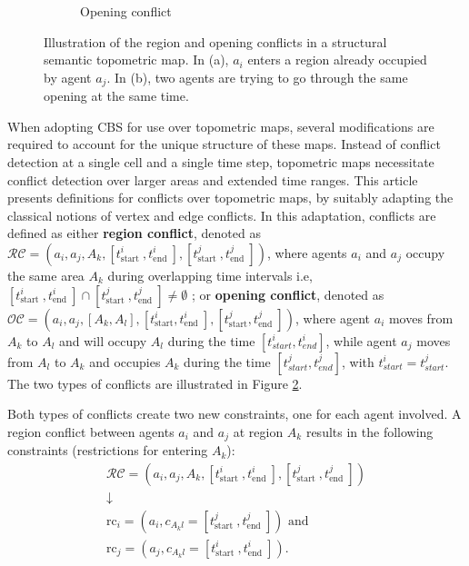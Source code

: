 \documentclass[letterpaper, 10 pt, conference]{ieeeconf}  %
\begin{document}
\begin{figure}[tb]
\begin{subfigure}[b]{.4\linewidth}
         \caption{Opening conflict}
         \label{fig:openingC}
    \end{subfigure}
    \caption{Illustration of the region and opening conflicts in a structural semantic topometric map. In (a), $a_i$ enters a region already occupied by agent $a_j$. In (b), two agents are trying to go through the same opening at the same time.}
    \label{fig:conflict}
\end{figure}

When adopting CBS for use over topometric maps, several modifications are required to account for the unique structure of these maps. Instead of conflict detection at a single cell and a single time step, topometric maps necessitate conflict detection over larger areas and extended time ranges. 
This article presents definitions for conflicts over topometric maps, by suitably adapting the classical notions of vertex and edge conflicts. In this adaptation, conflicts are defined as either \textbf{region conflict}, denoted as $\mathcal{RC}=\left(a_i, a_j, A_k,[t_{\text {start }}^i, t_{\text {end }}^i],[t_{\text {start }}^j, t_{\text {end }}^j]\right)$, where agents $a_i$ and $a_j$ occupy the same area $A_k$ during overlapping time intervals i.e, $[t_{\text {start }}^i, t_{\text {end }}^i] \cap [t_{\text {start }}^j, t_{\text {end }}^j]\neq \emptyset$ ; or \textbf{opening conflict}, denoted as $\mathcal{OC}=\left(a_i, a_j,[A_k,A_l],[t_{\mathrm{start}}^i, t_{\text {end }}^i],[t_{\mathrm{start}}^j, t_{\text {end }}^j]\right)$, where agent $a_i$ moves from $A_k$ to $A_l$ and will occupy $A_l$ during the time $[t_{start}^i,t_{end}^i]$, while agent $a_j$ moves from $A_l$ to $A_k$ and occupies $A_k$ during the time $[t_{start}^j,t_{end}^j]$, with $t_{start}^i = t_{start}^j$. The two types of conflicts are illustrated in Figure \ref{fig:conflict}. 

Both types of conflicts create two new constraints, one for each agent involved. A region conflict between agents $a_i$ and $a_j$ at region $A_k$ results in the following constraints (restrictions for entering $A_k$):
\begin{equation}
\begin{matrix}
    \mathcal{RC}=\left(a_i, a_j, A_k,[t_{\text {start }}^i, t_{\text {end }}^i],[t_{\text {start }}^j, t_{\text {end }}^j]\right) \\
    \downarrow\\
    \mathrm{rc}_i=\left(a_i, c_{A_kl}=[t_{\text {start }}^j, t_{\text {end }}^j]\right) \text{ and}\\
    \mathrm{rc}_j=\left(a_j, c_{A_kl}=[t_{\text {start }}^i, t_{\text {end }}^i]\right).\\
\end{matrix}
\end{equation}
\end{document}
